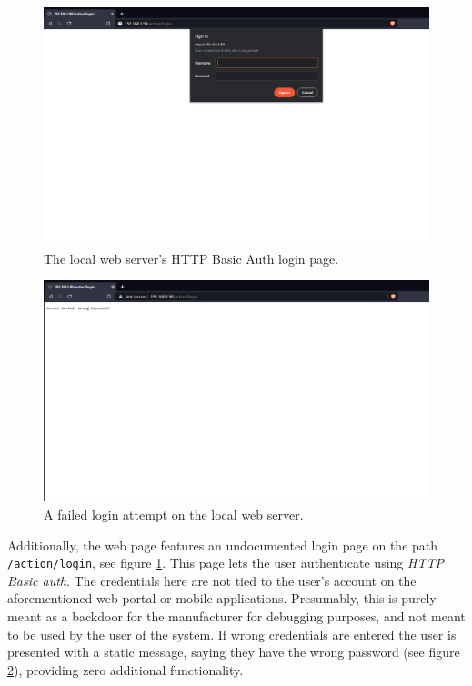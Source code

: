 \begin{figure}[!ht]
    \centering
    \includegraphics[width=\textwidth]{images/3-system/local-login-page.png}
    \caption{The local web server's HTTP Basic Auth login page.}
    \label{fig:local-login-page}
\end{figure}
\begin{figure}[!ht]
    \centering
    \includegraphics[width=\textwidth]{images/3-system/local-login-denied.png}
    \caption{A failed login attempt on the local web server.}
    \label{fig:local-login-denied}
\end{figure}
Additionally, the web page features an undocumented login page on the path \texttt{/action/login}, see figure \ref{fig:local-login-page}. This page lets the user authenticate using \textit{HTTP Basic auth}. The credentials here are not tied to the user's account on the aforementioned web portal or mobile applications. Presumably, this is purely meant as a backdoor for the manufacturer for debugging purposes, and not meant to be used by the user of the system. If wrong credentials are entered the user is presented with a static message, saying they have the wrong password (see figure \ref{fig:local-login-denied}), providing zero additional functionality.